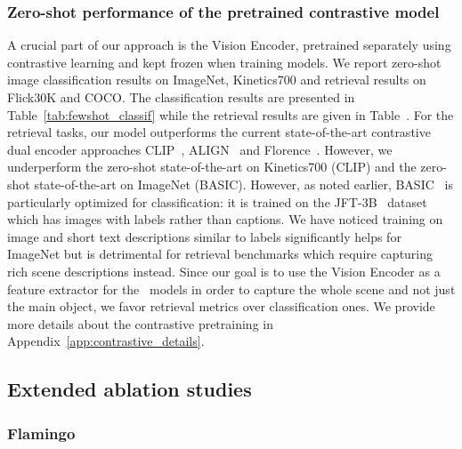 







\subsubsection{Zero-shot performance of the pretrained contrastive model}
\label{app:exp-contrastive}



A crucial part of our approach is the Vision Encoder, pretrained separately using contrastive learning and kept frozen when training \method{} models.
We report zero-shot image classification results on ImageNet, Kinetics700 and retrieval results on Flick30K and COCO.
The classification results are presented in Table~\ref{tab:fewshot_classif} while the retrieval results are given in Table~.
For the retrieval tasks, our model outperforms the current state-of-the-art contrastive dual encoder approaches CLIP~\citep{clip}, ALIGN~\citep{align} and Florence~\citep{yuan2021florence}.
However, we underperform the zero-shot state-of-the-art on Kinetics700 (CLIP) and the zero-shot state-of-the-art on ImageNet (BASIC).
However, as noted earlier, BASIC~\citep{pham2021combined} is particularly optimized for classification:
it is trained on the JFT-3B~\citep{jft3b} dataset which has images with labels rather than captions.
We have noticed training on image and short text descriptions similar to labels significantly helps for ImageNet but is detrimental for retrieval benchmarks which require capturing rich scene descriptions instead.
Since our goal is to use the Vision Encoder as a feature extractor for the~\method{} models in order to capture the whole scene and not just the main object, we favor retrieval metrics over classification ones.
We provide more details about the contrastive pretraining in Appendix~\ref{app:contrastive_details}.

\subsection{Extended ablation studies}
\label{app:all_ablation_studies}

\subsubsection{Flamingo}

